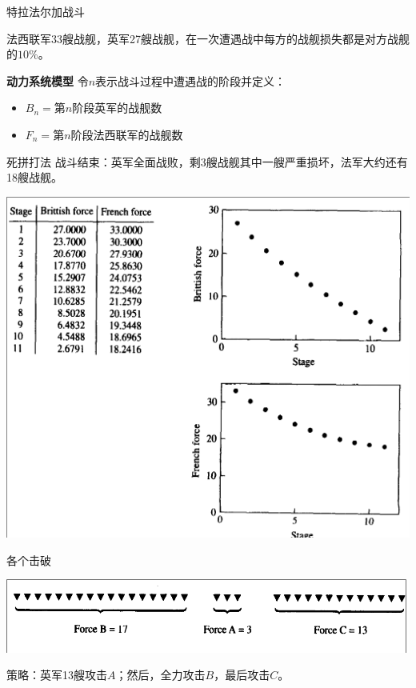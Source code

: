 \documentclass{beamer}
\begin{document}
\begin{frame}{特拉法尔加战斗}

  法西联军33艘战舰，英军27艘战舰，在一次遭遇战中每方的战舰损失都是对方战舰的$10\%$。

  {\bf{}动力系统模型} 令$n$表示战斗过程中遭遇战的阶段并定义：

  \begin{definition}
    \begin{itemize}
    \item $B_n = $第$n$阶段英军的战舰数
    \item $F_n = $第$n$阶段法西联军的战舰数
    \end{itemize}
  \end{definition}

\end{frame}

\begin{frame}{死拼打法}
  战斗结束：英军全面战败，剩3艘战舰其中一艘严重损坏，法军大约还有18艘战舰。
  \begin{center}
    \includegraphics[width=.6\textwidth{}]{fight-death.png}
  \end{center}
\end{frame}

\begin{frame}{各个击破}
  \begin{center}
    \includegraphics[width=.6\textwidth{}]{fight-france.png}
  \end{center}
  
  策略：英军13艘攻击$A$；然后，全力攻击$B$，最后攻击$C$。
  
\end{frame}
\end{document}
